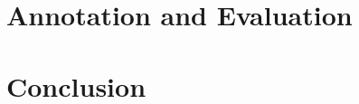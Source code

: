 \documentclass[twoside]{ctuthesis}
\theoremstyle{plain}
\theoremstyle{definition}
\theoremstyle{note}
\begin{document}
\chapter{Annotation and Evaluation}




\chapter{Conclusion}

\appendix

\printindex

 

\end{document}

